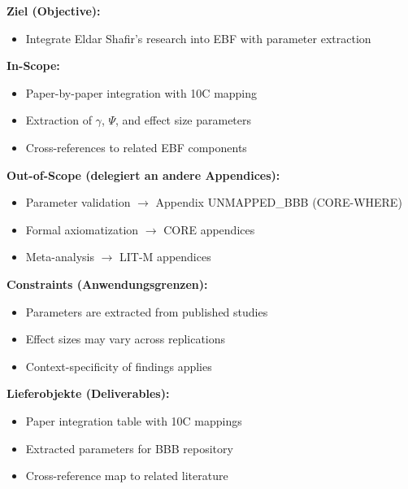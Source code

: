 
\begin{tcolorbox}[
    colback=orange!5!white,
    colframe=orange!75!black,
    title={\textbf{Appendix Scope: Ziel / In-Scope / Out-of-Scope / Constraints}},
    fonttitle=\bfseries
]

\textbf{Ziel (Objective):}
\begin{itemize}[nosep]
    \item Integrate Eldar Shafir's research into EBF with parameter extraction
\end{itemize}

\textbf{In-Scope:}
\begin{itemize}[nosep]
    \item Paper-by-paper integration with 10C mapping
    \item Extraction of $\gamma$, $\Psi$, and effect size parameters
    \item Cross-references to related EBF components
\end{itemize}

\textbf{Out-of-Scope (delegiert an andere Appendices):}
\begin{itemize}[nosep]
    \item Parameter validation $\rightarrow$ Appendix UNMAPPED_BBB (CORE-WHERE)
    \item Formal axiomatization $\rightarrow$ CORE appendices
    \item Meta-analysis $\rightarrow$ LIT-M appendices
\end{itemize}

\textbf{Constraints (Anwendungsgrenzen):}
\begin{itemize}[nosep]
    \item Parameters are extracted from published studies
    \item Effect sizes may vary across replications
    \item Context-specificity of findings applies
\end{itemize}

\textbf{Lieferobjekte (Deliverables):}
\begin{itemize}[nosep]
    \item Paper integration table with 10C mappings
    \item Extracted parameters for BBB repository
    \item Cross-reference map to related literature
\end{itemize}

\end{tcolorbox}

